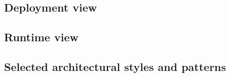 \documentclass[a4paper,11pt]{report} %
\begin{document}
	
	\subsection{Deployment view}
	\begin{minipage}{\linewidth}
	\end{minipage} \linebreak
	
	\subsection{Runtime view}
	
	\subsection{Selected architectural styles and patterns}
\end{document}
